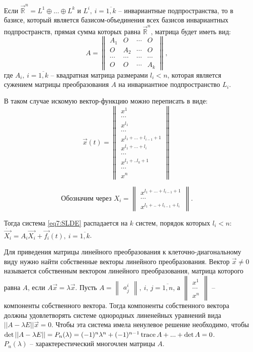Если $\overrightarrow{\mathbb{R}}^n = L^1 \oplus ... \oplus L^k$ и $L^i, ~i = \overline{1, k}$ -- инвариантные подпространства, то в базисе, который является базисом-объединения всех базисов инвариантных подпространств, прямая сумма которых равна $\overrightarrow{\mathbb{R}}^n$, матрица будет иметь вид:
\[A = \begin{Vmatrix} A_1 & O & \cdots & O \\ O & A_2 & \cdots & O \\ \cdots & \cdots & \cdots & \cdots \\ O & O &\cdots & A_k \end{Vmatrix}, \]
где $A_i, ~i = \overline{1, k}$ -- квадратная матрица размерами $l_i < n$, которая является сужением матрицы преобразования $A$ на инвариантное подпространство $L_i$.

В таком случае искомую вектор-функцию можно переписать в виде: 
\[ \overrightarrow{x}(t) = \begin{Vmatrix} x^1 \\ \cdots \\ x^{l_1} \\ \cdots \\ x^{l_1 + ... + l_{i-1} + 1} \\ x^{l_1 + ... + l_{i}} \\ \cdots \\ x^{l_1 + .. l_k + 1} \\ \cdots \\ x^n \end{Vmatrix}\]

\[\text{Обозначим через } X_i = \begin{Vmatrix} x^{l_1 + ... + l_{i-1} + 1} \\ \cdots \\ x^{l_1 + .. + l_{i-1} + l_{i}}\end{Vmatrix}. \]

Тогда система \eqref{eq7:SLDE} распадается на $k$ систем, порядок которых $l_i < n$: \\
$\dot{\overrightarrow{X_i}} = A_i \overrightarrow{X_i} + \overrightarrow{f_i}(t), ~i =\overline{1, k}$.

Для приведения матрицы линейного преобразования к клеточно-диагональному виду нужно найти собственные векторы линейного преобразования. 
Вектор $\overrightarrow{x} \neq 0$ называется собственным вектором линейного преобразования, матрица которого равна $A$, если $A\overrightarrow{x} = \lambda \overrightarrow{x}$. 
Пусть $A = \begin{Vmatrix} a_j^i \end{Vmatrix}, ~i,\,j = \overline{1, n}$, а $\begin{Vmatrix} x^1 \\ \cdots \\ x^n \end{Vmatrix}$ -- компоненты собственного вектора.
Тогда компоненты собственного вектора должны удовлетворять системе однородных линенейных уравнений вида $|| A - \lambda E|| \overrightarrow{x} = 0$. 
Чтобы эта система имела ненулевое решение необходимо, чтобы $\det || A - \lambda E|| = P_n(\lambda) = (-1)^n \lambda^n + (-1)^{n-1} \operatorname{trace} A + ... + \det A = 0$. \\
$P_n(\lambda)$ -- характерестический многочлен матрицы $A$. 

